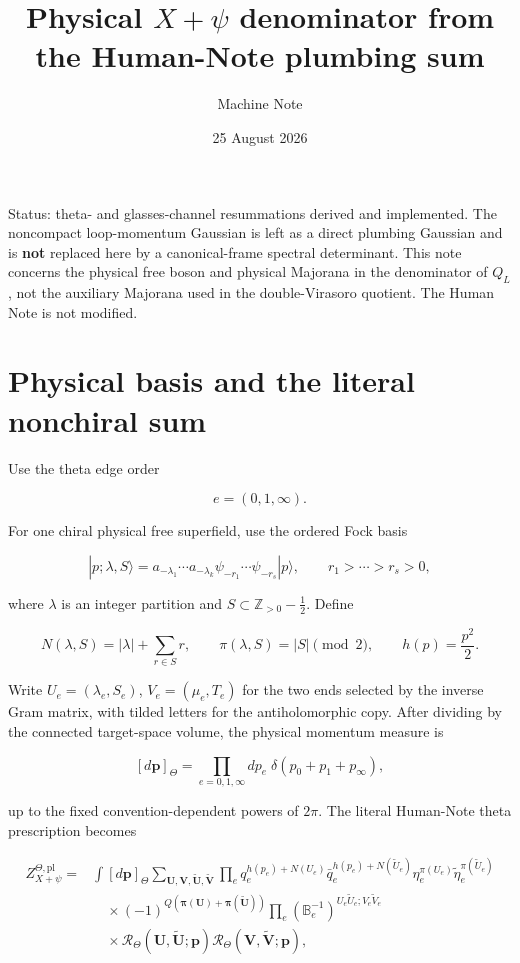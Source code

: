 \documentclass[11pt]{article}
\title{Physical \(X+\psi\) denominator from the Human-Note plumbing sum}
\author{Machine Note}
\date{25 August 2026}
\begin{document}
\maketitle
\tableofcontents
\bigskip

Status: theta- and glasses-channel resummations derived and implemented.  The
noncompact loop-momentum Gaussian is left as a direct plumbing Gaussian and
is \textbf{not} replaced here by a canonical-frame spectral determinant.  This
note concerns the physical free boson and physical Majorana in the denominator
of \(Q_L\), not the auxiliary Majorana used in the double-Virasoro quotient.
The Human Note is not modified.

\section{Physical basis and the literal nonchiral sum}

Use the theta edge order

\[
 e=(0,1,\infty).
\]

For one chiral physical free superfield, use the ordered Fock basis

\[
 |p;\lambda,S\rangle
 =a_{-\lambda_1}\cdots a_{-\lambda_k}
   \psi_{-r_1}\cdots\psi_{-r_s}|p\rangle,
 \qquad
 r_1>\cdots>r_s>0,
\]

where \(\lambda\) is an integer partition and
\(S\subset\mathbb Z_{>0}-\tfrac12\).  Define

\[
 N(\lambda,S)=|\lambda|+\sum_{r\in S}r,
 \qquad
 \pi(\lambda,S)=|S|\pmod2,
 \qquad h(p)=\frac{p^2}{2}.
\]

Write \(U_e=(\lambda_e,S_e)\), \(V_e=(\mu_e,T_e)\) for the two
ends selected by the inverse Gram matrix, with tilded letters for the
antiholomorphic copy.  After dividing by the connected target-space volume,
the physical momentum measure is

\[
 [d\mathbf p]_{\Theta}
 =\prod_{e=0,1,\infty}dp_e\;
   \delta(p_0+p_1+p_\infty),
\]

up to the fixed convention-dependent powers of \(2\pi\).  The literal
Human-Note theta prescription becomes

\[
\boxed{
\begin{aligned}
Z_{X+\psi}^{\Theta,\mathrm{pl}}
={}&\int[d\mathbf p]_{\Theta}
\sum_{\mathbf U,\mathbf V,
      \widetilde{\mathbf U},\widetilde{\mathbf V}}
\prod_e
 q_e^{h(p_e)+N(U_e)}
 \bar q_e^{h(p_e)+N(\widetilde U_e)}
 \eta_e^{\pi(U_e)}
 \widetilde\eta_e^{\pi(\widetilde U_e)}
\\
&\quad\times
(-1)^{Q(\boldsymbol\pi(\mathbf U)
          +\boldsymbol\pi(\widetilde{\mathbf U}))}
\prod_e
 \left(\mathbb B_e^{-1}\right)^{
 U_e\widetilde U_e;V_e\widetilde V_e}
\\
&\quad\times
\mathcal R_{\Theta}(\mathbf U,\widetilde{\mathbf U};\mathbf p)
\mathcal R_{\Theta}(\mathbf V,\widetilde{\mathbf V};\mathbf p),
\end{aligned}}
\tag{1.1}
\]
\end{document}
